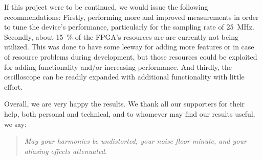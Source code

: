 If  this  project  were  to  be   continued,  we  would  issue  the  following
recommendations: Firstly, performing  more and improved measurements  in order
to  tune the  device's  performance,  particularly for  the  sampling rate  of
\SI{25}{\MHz}.  Secondly, about \SI{15}{\percent}  of the FPGA's resources are
are  currently not  being utilized.   This was  done to  have some  leeway for
adding more features  or in case of resource problems  during development, but
those resources could be exploited  for adding functionality and/or increasing
performance. And  thirdly,  the  oscilloscope  can be  readily  expanded  with
additional functionality with little effort.

Overall, we are very happy the  results. We thank all our supporters for their
help,  both personal  and  technical, and  to whomever  may  find our  results
useful, we say:
\begin{quote}
\centering
\emph{%
    May  your harmonics  be undistorted,  your  noise floor  minute, and  your
    aliasing effects attenuated.%
}
\end{quote}
